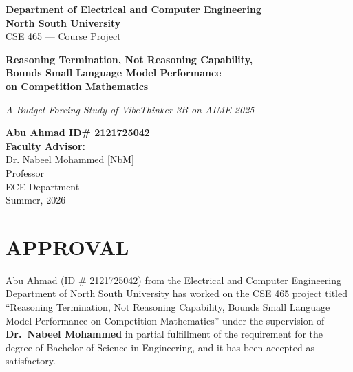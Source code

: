 \documentclass[12pt,a4paper,oneside]{report}
\begin{document}
\begin{titlepage}
\centering
\vspace*{0.5cm}

{\large\bfseries Department of Electrical and Computer Engineering}\\[4pt]
{\large\bfseries North South University}\\[30pt]

{\large CSE 465 --- Course Project}\\[40pt]

{\LARGE\bfseries\color{nsublue}
Reasoning Termination, Not Reasoning Capability,\\[6pt]
Bounds Small Language Model Performance\\[6pt]
on Competition Mathematics\par}

\vspace{12pt}
{\large\itshape A Budget-Forcing Study of VibeThinker-3B on AIME 2025\par}

\vspace{50pt}

{\large\bfseries Abu Ahmad \quad ID\# 2121725042}\\[60pt]

{\large\bfseries Faculty Advisor:}\\[8pt]
{\large Dr. Nabeel Mohammed [NbM]}\\[4pt]
{\large Professor}\\[4pt]
{\large ECE Department}\\[30pt]

{\large Summer, 2026}

\vfill
\end{titlepage}

\chapter*{APPROVAL}

Abu Ahmad (ID \# 2121725042) from the Electrical and Computer Engineering
Department of North South University has worked on the CSE 465 project titled
``Reasoning Termination, Not Reasoning Capability, Bounds Small Language Model
Performance on Competition Mathematics'' under the supervision of
\textbf{Dr.\ Nabeel Mohammed} in partial fulfillment of the requirement for the
degree of Bachelor of Science in Engineering, and it has been accepted as
satisfactory.
\end{document}
